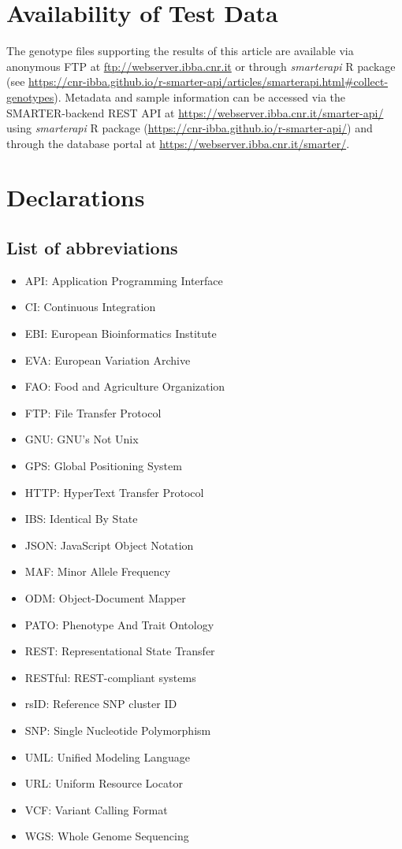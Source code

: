 \documentclass[a4paper,num-refs,gigabyte]{oup-contemporary}
\begin{document}
\section{Availability of Test Data}

The genotype files supporting the results of this article are available via anonymous FTP at \url{ftp://webserver.ibba.cnr.it} or through \emph{smarterapi} R package (see \url{https://cnr-ibba.github.io/r-smarter-api/articles/smarterapi.html#collect-genotypes}). Metadata and sample information can be accessed via the SMARTER-backend REST API at \url{https://webserver.ibba.cnr.it/smarter-api/} using \emph{smarterapi} R package (\url{https://cnr-ibba.github.io/r-smarter-api/}) and through the database portal at \url{https://webserver.ibba.cnr.it/smarter/}.

\section{Declarations}

\subsection{List of abbreviations}

\begin{itemize}
\item API: Application Programming Interface
\item CI: Continuous Integration
\item EBI: European Bioinformatics Institute
\item EVA: European Variation Archive
\item FAO: Food and Agriculture Organization
\item FTP: File Transfer Protocol
\item GNU: GNU's Not Unix
\item GPS: Global Positioning System
\item HTTP: HyperText Transfer Protocol
\item IBS: Identical By State
\item JSON: JavaScript Object Notation
\item MAF: Minor Allele Frequency
\item ODM: Object-Document Mapper
\item PATO: Phenotype And Trait Ontology
\item REST: Representational State Transfer
\item RESTful: REST-compliant systems
\item rsID: Reference SNP cluster ID
\item SNP: Single Nucleotide Polymorphism
\item UML: Unified Modeling Language
\item URL: Uniform Resource Locator
\item VCF: Variant Calling Format
\item WGS: Whole Genome Sequencing
\end{itemize}
\end{document}
